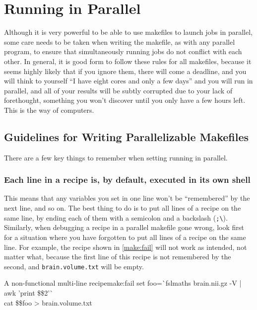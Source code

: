 \chapter{Running \maken{} in Parallel}
\label{chap:parallel}

Although it is very powerful to be able to use makefiles to launch jobs in parallel, some care needs to be taken when writing the makefile, as with any parallel program, to ensure that simultaneously running jobs do not conflict with each other. In general, it is good form to follow these rules for all makefiles, because it seems highly likely that if you ignore them, there will come a deadline, and you will think to yourself ``I have eight cores and only a few days'' and you will run \maken{} in parallel, and all of your results will be subtly corrupted due to your lack of forethought, something you won't discover until you only have a few hours left. This is the way of computers.

\section{Guidelines for Writing Parallelizable Makefiles}

There are a few key things to remember when setting running \maken{} in parallel.

\subsection{Each line in a recipe is, by default, executed in its own shell}

This means that any variables you set in one line won't be ``remembered'' by the next line, and so on. The best thing to do is to put all lines of a recipe on the same line, by ending each of them with a semicolon and a backslash (\texttt{;\textbackslash}). Similarly, when debugging a recipe in a parallel makefile gone wrong, look first for a situation where you have forgotten to put all lines of a recipe on the same line. For example, the recipe shown in \autoref{make:fail} will not work as intended, not matter what, because the first line of this recipe is not remembered by the second, and \texttt{brain.volume.txt} will be empty.
\begin{make}{A non-functional multi-line recipe}{make:fail}
	set foo=\`{}fslmaths brain.nii.gz -V | awk '{print \$\$2}'\`{} \\
	cat \$\$foo > brain.volume.txt
\end{make}


